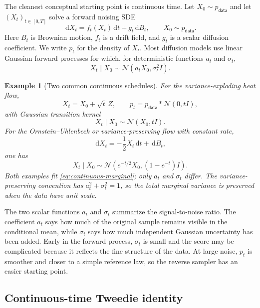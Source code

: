 \documentclass[10pt,a4paper]{amsart}
\numberwithin{equation}{section}
\newtheorem*{example}{Example}
\newcommand{\dd}{\,\mathrm{d}}
\newcommand{\Id}{I}
\newcommand{\pdata}{p_{\mathsf{data}}}
\newcommand{\normal}[2]{\mathcal{N}\!\left(#1,#2\right)}
\begin{document}
The cleanest conceptual starting point is continuous time.  Let
$X_0\sim\pdata$ and let $(X_t)_{t\in[0,T]}$ solve a forward noising SDE
\begin{equation}\label{eq:forward-sde}
    \dd X_t=f_t(X_t)\dd t+g_t\dd B_t,
    \qquad X_0\sim\pdata.
\end{equation}
Here $B_t$ is Brownian motion, $f_t$ is a drift field, and $g_t$ is a scalar
diffusion coefficient.  We write $p_t$ for the density of $X_t$.
Most diffusion models use linear Gaussian forward processes for which, for
deterministic functions $a_t$ and $\sigma_t$,
\begin{equation}\label{eq:continuous-marginal}
    X_t\mid X_0\sim\normal{a_tX_0}{\sigma_t^2\Id}.
\end{equation}
\begin{example}[Two common continuous schedules]
For the variance-exploding heat flow,
\[
    X_t=X_0+\sqrt t\,Z,\qquad p_t=\pdata*\normal{0}{t\Id},
\]
with Gaussian transition kernel
\[
    X_t\mid X_0\sim\normal{X_0}{t\Id}.
\]
For the Ornstein--Uhlenbeck or variance-preserving flow with constant rate,
\[
    \dd X_t=-\frac12 X_t\dd t+\dd B_t,
\]
one has
\[
    X_t\mid X_0\sim\normal{e^{-t/2}X_0}{(1-e^{-t})\Id}.
\]
Both examples fit \eqref{eq:continuous-marginal}; only $a_t$ and
$\sigma_t$ differ.  The variance-preserving convention has
$a_t^2+\sigma_t^2=1$, so the total marginal variance is preserved when the data
have unit scale.
\end{example}

The two scalar functions $a_t$ and $\sigma_t$ summarize the signal-to-noise
ratio.  The coefficient $a_t$ says how much of the original sample remains
visible in the conditional mean, while $\sigma_t$ says how much independent
Gaussian uncertainty has been added.  Early in the forward process,
$\sigma_t$ is small and the score may be complicated because it reflects the
fine structure of the data.  At large noise, $p_t$ is smoother and closer to a
simple reference law, so the reverse sampler has an easier starting point.


\subsection{Continuous-time Tweedie identity}\label{subsec:continuous-tweedie}
\end{document}
